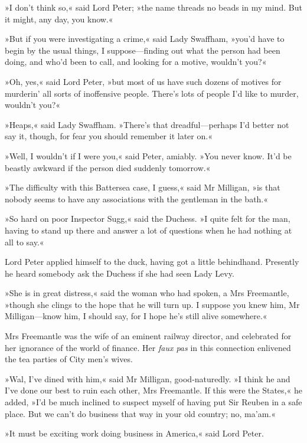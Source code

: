 »I don't think so,« said Lord Peter; »the name threads no beads in my mind. But it might, any day, you know.«

»But if you were investigating a crime,« said Lady Swaffham, »you'd have to begin by the usual things, I suppose\allowbreak---\allowbreak finding out what the person had been doing, and who'd been to call, and looking for a motive, wouldn't you?«

»Oh, yes,« said Lord Peter, »but most of us have such dozens of motives for murderin' all sorts of inoffensive people. There's lots of people I'd like to murder, wouldn't you?«

»Heaps,« said Lady Swaffham. »There's that dreadful\allowbreak---\allowbreak perhaps I'd better not say it, though, for fear you should remember it later on.«

»Well, I wouldn't if I were you,« said Peter, amiably. »You never know. It'd be beastly awkward if the person died suddenly tomorrow.«

»The difficulty with this Battersea case, I guess,« said Mr Milligan, »is that nobody seems to have any associations with the gentleman in the bath.«

»So hard on poor Inspector Sugg,« said the Duchess. »I quite felt for the man, having to stand up there and answer a lot of questions when he had nothing at all to say.«

Lord Peter applied himself to the duck, having got a little behindhand. Presently he heard somebody ask the Duchess if she had seen Lady Levy.

»She is in great distress,« said the woman who had spoken, a Mrs Freemantle, »though she clings to the hope that he will turn up. I suppose you knew him, Mr Milligan\allowbreak---\allowbreak know him, I should say, for I hope he's still alive somewhere.«

Mrs Freemantle was the wife of an eminent railway director, and celebrated for her ignorance of the world of finance. Her \textit{faux pas} in this connection enlivened the tea parties of City men's wives.

»Wal, I've dined with him,« said Mr Milligan, good-naturedly. »I think he and I've done our best to ruin each other, Mrs Freemantle. If this were the States,« he added, »I'd be much inclined to suspect myself of having put Sir Reuben in a safe place. But we can't do business that way in your old country; no, ma'am.«

»It must be exciting work doing business in America,« said Lord Peter.

